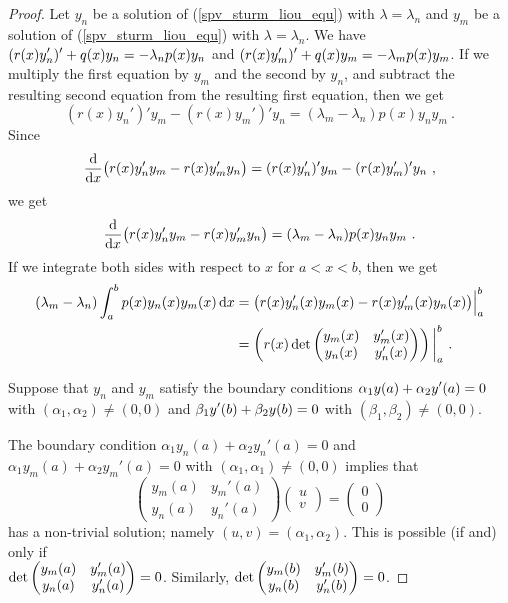 \begin{proof}
Let $y_n$ be a solution of (\ref{spv_sturm_liou_equ}) with
$\lambda=\lambda_n$ and $y_m$ be a solution of (\ref{spv_sturm_liou_equ})
with $\lambda=\lambda_n$.  We have
$\DS (r(x) y_n')' + q(x)y_n = - \lambda_n p(x) y_n$ and
$\DS (r(x) y_m')' + q(x)y_m = - \lambda_m p(x) y_m$.
If we multiply the first equation by $y_m$ and the second by $y_n$, and
subtract the resulting second equation from the resulting first
equation, then we get
\[
(r(x) y_n')'y_m - (r(x) y_m')'y_n = (\lambda_m - \lambda_n)p(x) y_n y_m \ .
\]
Since
\[
\dfdx{\big(r(x) y_n'y_m - r(x) y_m'y_n\big)}{x} =
(r(x) y_n')'y_m - (r(x) y_m')'y_n \ ,
\]
we get
\[
\dfdx{\big(r(x) y_n'y_m - r(x) y_m'y_n\big)}{x}
= (\lambda_m - \lambda_n)p(x) y_n y_m \ .
\]
If we integrate both sides with respect to $x$ for $a< x < b$, then we get
\begin{equation} \label{SL_orth_proof}
\begin{split}
(\lambda_m - \lambda_n) \int_a^b p(x) y_n(x) y_m(x) \dx{x} &=
\big(r(x) y_n'(x)y_m(x) - r(x) y_m'(x)y_n(x)\big)\Big|_a^b \\
&= \left( r(x)
\det \begin{pmatrix} y_m(x) & y_m'(x) \\ y_n(x) & y_n'(x) \end{pmatrix}
\right)\bigg|_a^b \ .
\end{split}
\end{equation}

 Suppose that $y_n$ and $y_m$ satisfy the boundary conditions
$\DS \alpha_1 y(a) + \alpha_2 y'(a) = 0$
with $(\alpha_1,\alpha_2)\neq (0,0)$ and
$\DS \beta_1 y'(b) + \beta_2 y(b) = 0$ with
$(\beta_1,\beta_2) \neq (0,0)$.

The boundary condition
$\alpha_1 y_n(a) + \alpha_2 y_n'(a) = 0$ and
$\alpha_1 y_m(a) + \alpha_2 y_m'(a) = 0$ with
$(\alpha_1,\alpha_1)\neq (0,0)$ implies that
\[
\begin{pmatrix} y_m(a) & y_m'(a) \\ y_n(a) & y_n'(a) \end{pmatrix}
\begin{pmatrix} u \\ v \end{pmatrix}
= \begin{pmatrix} 0 \\ 0 \end{pmatrix}
\]
has a non-trivial solution; namely $(u,v) = (\alpha_1, \alpha_2)$.  This is
possible (if and) only if\\
$\DS 
\det \begin{pmatrix} y_m(a) & y_m'(a) \\ y_n(a) & y_n'(a) \end{pmatrix} = 0$.
Similarly,
$\DS
\det \begin{pmatrix} y_m(b) & y_m'(b) \\ y_n(b) & y_n'(b) \end{pmatrix} = 0$.


\end{proof}
